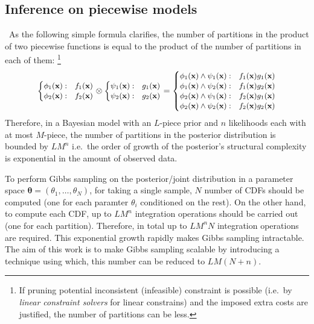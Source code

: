 %
\subsection{Inference on piecewise models}\
As the following simple formula clarifies, 
the number of partitions in the product of two piecewise functions is equal to the product of the number of partitions in each of them:
\footnote{
If pruning potential inconsistent (infeasible) constraint is possible
(i.e.\ by \emph{linear constraint solvers} for linear constrains) and the imposed extra costs are justified,
the number of partitions can be less.
}%
\[
{\footnotesize
\begin{cases}
\phi_1(\bvec{x}) : & f_1(\bvec{x})\\
\phi_2(\bvec{x}) : & f_2(\bvec{x})
\end{cases}
\otimes
\begin{cases}
\psi_1(\bvec{x}) : & g_1(\bvec{x})\\
\psi_2(\bvec{x}) : & g_2(\bvec{x})
\end{cases}
=
\begin{cases}
\phi_1(\bvec{x}) \wedge \psi_1(\bvec{x}) : & f_1(\bvec{x}) g_1(\bvec{x})\\
\phi_1(\bvec{x}) \wedge \psi_2(\bvec{x}) : & f_1(\bvec{x}) g_2(\bvec{x})\\
\phi_2(\bvec{x}) \wedge \psi_1(\bvec{x}) : & f_2(\bvec{x}) g_1(\bvec{x})\\
\phi_2(\bvec{x}) \wedge \psi_2(\bvec{x}) : & f_2(\bvec{x}) g_2(\bvec{x})
\end{cases}
}%
\]
Therefore, in a Bayesian model with an $L$-piece prior and $n$ likelihoods each with at most $M$-piece,
the number of partitions in the posterior distribution is bounded
 by $LM^n$
i.e.\ the order of growth of the posterior's structural complexity is exponential in the amount of observed data. 

To perform Gibbs sampling on the posterior/joint distribution in a parameter space 
$\boldsymbol{\theta} = (\theta_1, \ldots, \theta_N)$,
for taking a single sample, $N$ number of CDFs should be computed (one for each paramter $\theta_i$ conditioned on the rest).
On the other hand, to compute each CDF,  up to $LM^n$ integration operations should be carried out
(one for each partition). Therefore, in total up to $LM^nN$ integration operations are required. This exponential growth rapidly makes Gibbs sampling intractable. 
The aim of this work is to make Gibbs sampling scalable by introducing a technique using which, this number can be reduced to $LM(N+n)$.

